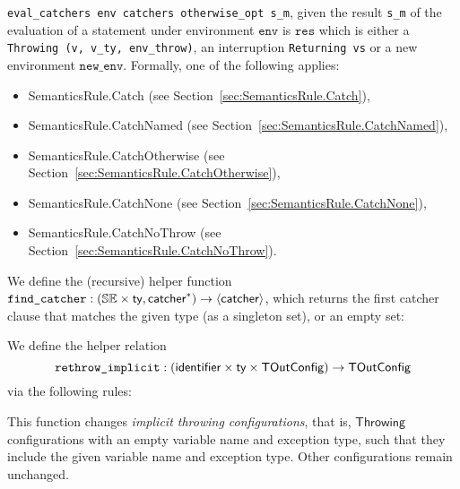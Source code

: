 \documentclass{book}
\newcommand\tenv[0]{\textsf{tenv}}
\newcommand\configdomain[1]{\texttt{config\_domain}({#1})}
\newcommand\evalarrow[0]{\stackrel{\mathsf{asl}}{\rightsquigarrow}}
\newcommand\TOutConfig[0]{\textsf{TOutConfig}}
\newcommand\rethrowimplicit[0]{\texttt{rethrow\_implicit}}
\newcommand\typesatisfies[0]{\texttt{type\_satisfies}}
\newcommand\Throwing[0]{\textsf{Throwing}}
\newcommand\newenv[0]{\texttt{new\_env}}
\newcommand\env[0]{\texttt{env}}
\newcommand\vc[0]{\texttt{c}}
\newcommand\vg[0]{\texttt{g}}
\newcommand\vv[0]{\texttt{v}}
\newcommand\vs[0]{\texttt{s}}
\newcommand\vres[0]{\texttt{res}}
\newcommand\catchers[0]{\texttt{catchers}}
\newcommand\envthrowone[0]{\texttt{env\_throw1}}
\newcommand\ety[0]{\texttt{e\_ty}}
\newcommand\vvty[0]{\texttt{v\_ty}}
\newcommand\nameopt[0]{\texttt{name\_opt}}
\begin{document}
\texttt{eval\_catchers env catchers otherwise\_opt s\_m}, given the result
\texttt{s\_m} of the evaluation of a statement under environment $\env$
is $\vres$ which is either a \texttt{Throwing (v, v\_ty, env\_throw)}, an
interruption \texttt{Returning vs} or a new environment $\newenv$.
Formally, one of the following applies:
\begin{itemize}
\item SemanticsRule.Catch (see Section~\ref{sec:SemanticsRule.Catch}),
\item SemanticsRule.CatchNamed (see Section~\ref{sec:SemanticsRule.CatchNamed}),
\item SemanticsRule.CatchOtherwise (see Section~\ref{sec:SemanticsRule.CatchOtherwise}),
\item SemanticsRule.CatchNone (see Section~\ref{sec:SemanticsRule.CatchNone}),
\item SemanticsRule.CatchNoThrow (see Section~\ref{sec:SemanticsRule.CatchNoThrow}).
\end{itemize}

\newcommand\findcatcher[0]{\texttt{find\_catcher}}
We define the (recursive) helper function $\findcatcher : (\staticenvs \times \ty, \catcher^*) \rightarrow \langle \catcher \rangle$,
which returns the first catcher clause that matches the given type (as a singleton set), or an empty set:

We define the helper relation
\[
  \rethrowimplicit : (\identifier \times \ty \times \TOutConfig) \rightarrow \TOutConfig
\]
via the following rules:
This function changes \emph{implicit throwing configurations}, that is, $\Throwing$ configurations with an empty
variable name and exception type, such that they include the given variable name and exception type.
Other configurations remain unchanged.
\end{document}
